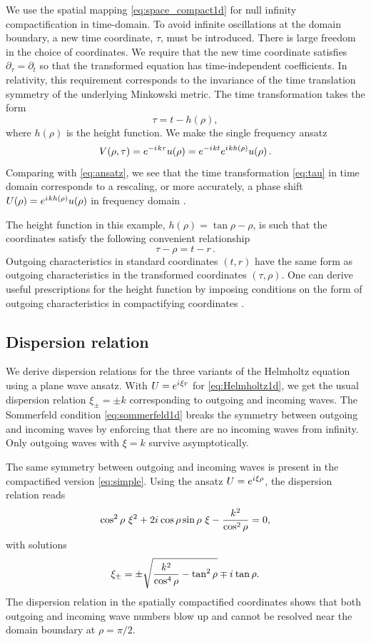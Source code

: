 \documentclass[final,onefignum,onetabnum]{siamart190516}
\newcommand{\be}{\begin{equation}}
\newcommand{\ee}{\end{equation}}
\newcommand{\iu}{{i\mkern1mu}}
\begin{document}
We use the spatial mapping \eqref{eq:space_compact1d} for null infinity compactification in time-domain. To avoid infinite oscillations at the domain boundary, a new time coordinate, $\tau$, must be introduced. There is large freedom in the choice of coordinates. We require that the new time coordinate satisfies $\partial_\tau=\partial_t$ so that the transformed equation has time-independent coefficients. In relativity, this requirement corresponds to the invariance of the time translation symmetry of the underlying Minkowski metric. The time transformation takes the form
\be\label{eq:tau} \tau = t - h(\rho),\ee
where $h(\rho)$ is the height function. We make the single frequency ansatz
\[ V(\rho, \tau) = e^{-\iu k \tau} u(\rho) = e^{-\iu k t} e^{\iu k h(\rho)} u(\rho)\,.\]
Comparing with \eqref{eq:ansatz}, we see that the time transformation \eqref{eq:tau} in time domain corresponds to a rescaling, or more accurately, a phase shift $U(\rho) = e^{\iu k h(\rho)} u(\rho)$ in frequency domain \cite{ZengFramework, marchner2021stable}.

The height function in this example, $h(\rho)=\tan\rho - \rho$, is such that the coordinates satisfy the following convenient relationship
\be\label{eq:time_chars} \tau - \rho = t - r\,.\ee
Outgoing characteristics in standard coordinates $(t,r)$ have the same form as outgoing characteristics in the transformed coordinates $(\tau,\rho)$. One can derive useful prescriptions for the height function by imposing conditions on the form of outgoing characteristics in compactifying coordinates \cite{ZENGINOGLU20112286, bernuzzi2011binary}.

\subsection{Dispersion relation}\label{sec:dispersion}
We derive dispersion relations for the three variants of the Helmholtz equation using a plane wave ansatz. With $U = e^{\iu \xi r}$ for \eqref{eq:Helmholtz1d}, we get the usual dispersion relation $\xi_\pm=\pm k$ corresponding to outgoing and incoming waves. The Sommerfeld condition \eqref{eq:sommerfeld1d} breaks the symmetry between outgoing and incoming waves by enforcing that there are no incoming waves from infinity. Only outgoing waves with $\xi = k$ survive asymptotically. 

The same symmetry between outgoing and incoming waves is present in the compactified version \eqref{eq:simple}. Using the ansatz $U=e^{\iu \xi \rho}$, the dispersion relation reads
\[ \cos^2\rho\ \xi^2 + 2\iu \cos\rho \sin\rho\ \xi - \frac{k^2}{\cos^2\rho} = 0, \]
with solutions
\be\label{eq:divergent_dispersion} \xi_\pm = \pm \sqrt{\frac{k^2}{\cos^4\rho}-\tan^2\rho} \mp \iu \tan\rho. \ee
The dispersion relation in the spatially compactified coordinates shows that both outgoing and incoming wave numbers blow up and cannot be resolved near the domain boundary at $\rho=\pi/2$.  
\end{document}
